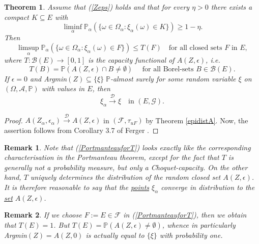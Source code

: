 \documentclass[sn-mathphys,Numbered]{sn-jnl}%
\theoremstyle{thmstyleone}%
\newtheorem{theorem}{Theorem}%
\theoremstyle{thmstyletwo}%
\newtheorem{remark}{Remark}%
\theoremstyle{thmstylethree}%
\begin{document}
\begin{theorem} \label{mbselections} Assume that (\ref{Zeps}) holds and that for every $\eta>0$ there exists a compact $K \subseteq E$ with
$$
 \liminf_\alpha \mathbb{P}_\alpha(\{\omega \in \Omega_\alpha: \xi_\alpha(\omega) \in K\}) \ge 1-\eta.
$$
Then
\begin{equation} \label{PortmanteauforT}
 \limsup_\alpha  \mathbb{P}_\alpha(\{\omega \in \Omega_\alpha: \xi_\alpha(\omega) \in F\}) \le T(F) \quad \text{for all closed sets } F \text{ in }E,
\end{equation}
where $T:\mathcal{B}(E) \rightarrow [0,1]$ is the \emph{capacity functional} of $A(Z,\epsilon)$, i.e.
$$
 T(B)=\mathbb{P}(A(Z,\epsilon) \cap B \neq \emptyset) \quad \text{ for all Borel-sets } B \in \mathcal{B}(E).
$$
If $\epsilon=0$ and Argmin$(Z) \subseteq \{\xi\} \; \mathbb{P}$-almost surely for some random variable $\xi$ on $(\Omega,\mathcal{A},\mathbb{P})$ with values in $E$, then
$$
 \xi_\alpha \stackrel{\mathcal{D}}{\rightarrow} \xi \quad \text{in } (E,\mathcal{G}).
$$
\end{theorem}

\begin{proof} $A(Z_\alpha,\epsilon_\alpha) \stackrel{\mathcal{D}}{\rightarrow} A(Z,\epsilon)$ in $(\mathcal{F}, \tau_{uF})$ by Theorem \ref{epidistA}. Now, the assertion follows from Corollary 3.7
of Ferger \cite{Ferger2}.
\end{proof}

\begin{remark} \label{convergencetoset} Note that (\ref{PortmanteauforT}) looks exactly like the corresponding characterisation in the Portmanteau theorem, except for the fact that $T$ is generally not a probability measure, but only a Choquet-capacity.
On the other hand, $T$ uniquely determines the distribution of the random closed set $A(Z,\epsilon)$. It is therefore reasonable to say that
the \underline{points} $\xi_\alpha$ converge in distribution to the \underline{set} $A(Z,\epsilon)$.
\end{remark}

\vspace{0.3cm}
\begin{remark} \label{notequaltotheemptyset}
If we choose $F:=E \in \mathcal{F}$ in (\ref{PortmanteauforT}), then we obtain that $T(E)=1$. But $T(E)=\mathbb{P}(A(Z,\epsilon) \neq \emptyset)$, whence in particularly Argmin$(Z)=A(Z,0)$ is actually equal to $\{\xi\}$ with probability one.
\end{remark}
\end{document}
